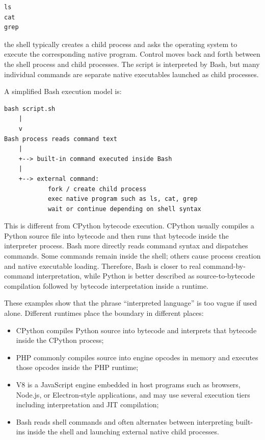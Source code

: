 \begin{verbatim}
ls
cat
grep
\end{verbatim}

the shell typically creates a child process and asks the operating system to execute the corresponding native program. Control moves back and forth between the shell process and child processes. The script is interpreted by Bash, but many individual commands are separate native executables launched as child processes.

A simplified Bash execution model is:

\begin{verbatim}
bash script.sh
    |
    v
Bash process reads command text
    |
    +--> built-in command executed inside Bash
    |
    +--> external command:
            fork / create child process
            exec native program such as ls, cat, grep
            wait or continue depending on shell syntax
\end{verbatim}

This is different from CPython bytecode execution. CPython usually compiles a Python source file into bytecode and then runs that bytecode inside the interpreter process. Bash more directly reads command syntax and dispatches commands. Some commands remain inside the shell; others cause process creation and native executable loading. Therefore, Bash is closer to real command-by-command interpretation, while Python is better described as source-to-bytecode compilation followed by bytecode interpretation inside a runtime.

These examples show that the phrase ``interpreted language'' is too vague if used alone. Different runtimes place the boundary in different places:

\begin{itemize}
    \item CPython compiles Python source into bytecode and interprets that bytecode inside the CPython process;
    \item PHP commonly compiles source into engine opcodes in memory and executes those opcodes inside the PHP runtime;
    \item V8 is a JavaScript engine embedded in host programs such as browsers, Node.js, or Electron-style applications, and may use several execution tiers including interpretation and JIT compilation;
    \item Bash reads shell commands and often alternates between interpreting built-ins inside the shell and launching external native child processes.
\end{itemize}


